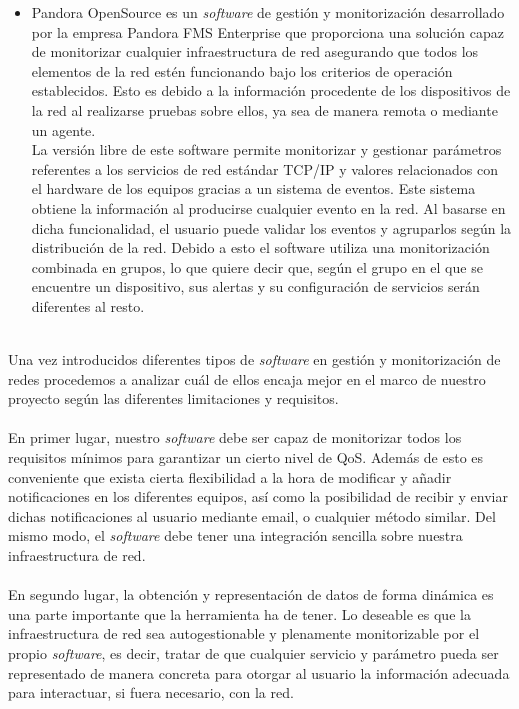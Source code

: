 \begin{itemize}
		\item Pandora OpenSource \cite{Pandora} es un \textit{software} de gestión y monitorización desarrollado por la empresa Pandora FMS Enterprise que proporciona una solución capaz de monitorizar cualquier infraestructura de red asegurando que todos los elementos de la red estén funcionando bajo los criterios de operación establecidos. Esto es debido a la información procedente de los dispositivos de la red al realizarse pruebas sobre ellos, ya sea de manera remota o mediante un agente. \\
		La versión libre de este software permite monitorizar y gestionar parámetros referentes a los servicios de red estándar TCP/IP y valores relacionados con el hardware de los equipos gracias a un sistema de eventos. Este sistema obtiene la información al producirse cualquier evento en la red. Al basarse en dicha funcionalidad, el usuario puede validar los eventos y agruparlos según la distribución de la red. Debido a esto el software utiliza una monitorización combinada en grupos, lo que quiere decir que, según el grupo en el que se encuentre un dispositivo, sus alertas y su configuración de servicios serán diferentes al resto.\\\\
	\end{itemize}
	
	Una vez introducidos diferentes tipos de \textit{software} en gestión y monitorización de redes procedemos a analizar cuál de ellos encaja mejor en el marco de nuestro proyecto según las diferentes limitaciones y requisitos.\\\\
	
	En primer lugar, nuestro \textit{software} debe ser capaz de monitorizar todos los requisitos mínimos para garantizar un cierto nivel de QoS. Además de esto es conveniente que exista cierta flexibilidad a la hora de modificar y añadir notificaciones en los diferentes equipos, así como la posibilidad de recibir y enviar dichas notificaciones al usuario mediante email, o cualquier método similar. Del mismo modo, el \textit{software} debe tener una integración sencilla sobre nuestra infraestructura de red.\\\\
	
	En segundo lugar, la obtención y representación de datos de forma dinámica es una parte importante que la herramienta ha de tener. Lo deseable es que la infraestructura de red sea autogestionable y plenamente monitorizable por el propio \textit{software}, es decir, tratar de que cualquier servicio y parámetro pueda ser representado de manera concreta para otorgar al usuario la información adecuada para interactuar, si fuera necesario, con la red.\\\\
	
